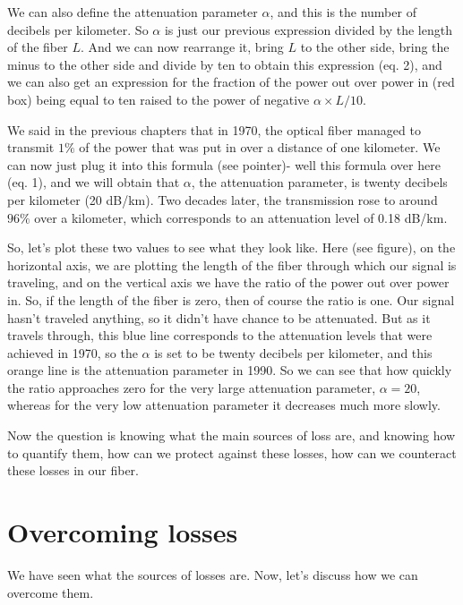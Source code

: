 We can also define the attenuation parameter $\alpha$, and this is the number of decibels per kilometer. So $\alpha$ is just our previous expression divided by the length of the fiber $L$. And we can now rearrange it, bring $L$ to the other side, bring the minus to the other side and divide by ten to obtain this expression (eq. 2), and we can also get an expression for the fraction of the power out over power in (red box) being equal to ten raised to the power of negative $\alpha \times L / 10$.

We said in the previous chapters that in 1970, the optical fiber managed to transmit $1\%$ of the power that was put in over a distance of one kilometer. We can now just plug it into this formula (see pointer)- well this formula over here (eq. 1), and we will obtain that $\alpha$, the attenuation parameter, is twenty decibels per kilometer (20 dB/km). Two decades later, the transmission rose to around $96\%$ over a kilometer, which corresponds to an attenuation level of 0.18 dB/km.

So, let's plot these two values to see what they look like. Here (see figure), on the horizontal axis, we are plotting the length of the fiber through which our signal is traveling, and on the vertical axis we have the ratio of the power out over power in. So, if the length of the fiber is zero, then of course the ratio is one. Our signal hasn't traveled anything, so it didn't have chance to be attenuated. But as it travels through, this blue line corresponds to the attenuation levels that were achieved in 1970, so the $\alpha$ is set to be twenty decibels per kilometer, and this orange line is the attenuation parameter in 1990. So we can see that how quickly the ratio approaches zero for the very large attenuation parameter, $\alpha = 20$, whereas for the very low attenuation parameter it decreases much more slowly.

Now the question is knowing what the main sources of loss are, and knowing how to quantify them, how can we protect against these losses, how can we counteract these losses in our fiber.



\section{Overcoming losses}
\label{sec:11-4_overcoming_losses}

We have seen what the sources of losses are. Now, let's discuss how we can overcome them.

